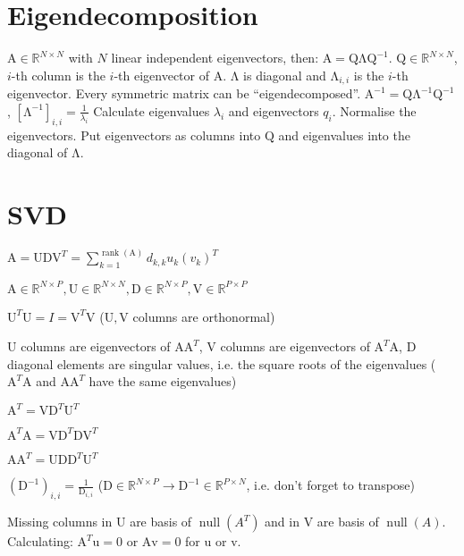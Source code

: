 \documentclass[a4paper, 11pt, landscape]{article}
\newcommand{\matr}[1]{\boldsymbol{\mathrm{#1}}}
\begin{document}
\begin{multicols*}{3}
\section{Eigendecomposition}
$\matr{A} \in \mathbb{R}^{N \times N}$ with $N$ linear independent eigenvectors, then: $\matr{A} = \matr{Q \Lambda Q}^{-1}$. $\matr{Q} \in \mathbb{R}^{N \times N}$, $i$-th column is the $i$-th eigenvector of $\matr{A}$. $\matr{\Lambda}$ is diagonal and $\matr{\Lambda}_{i,i}$ is the $i$-th eigenvector. Every symmetric matrix can be ``eigendecomposed''. 
$\matr{A}^{-1} = \matr{Q} \matr{\Lambda}^{-1} \matr{Q}^{-1}$, $\left[ \matr{\Lambda}^{-1} \right]_{i,i} = \frac{1}{\lambda_i}$ 
Calculate eigenvalues $\lambda_i$ and eigenvectors $q_i$. Normalise the eigenvectors. Put eigenvectors as columns into $\matr{Q}$ and eigenvalues into the diagonal of $\matr{\Lambda}$.

\section{SVD}
\begin{compactitem}
	\item $\matr{A} = \matr{U} \matr{D} \matr{V}^T = \sum_{k=1}^{\operatorname{rank}(\matr{A})} d_{k,k} u_k (v_k)^T$
	\item $\matr{A} \in \mathbb{R}^{N \times P}, \matr{U} \in \mathbb{R}^{N \times N}, \matr{D} \in \mathbb{R}^{N \times P}, \matr{V} \in \mathbb{R}^{P \times P}$
	\item $\matr{U}^T \matr{U} = I = \matr{V}^T \matr{V}$ ($\matr{U}, \matr{V}$ columns are orthonormal)
	\item $\matr{U}$ columns are eigenvectors of $\matr{A} \matr{A}^T$, $\matr{V}$ columns are eigenvectors of $\matr{A}^T \matr{A}$, $\matr{D}$ diagonal elements are singular values, i.e. the square roots of the eigenvalues ($\matr{A}^T \matr{A}$ and $\matr{A} \matr{A}^T$ have the same eigenvalues)
	\begin{listcols}
		\item $\matr{A}^T = \matr{V} \matr{D}^T \matr{U}^T$
		\item $\matr{A}^T \matr{A} = \matr{V} \matr{D}^T \matr{D} \matr{V}^T$
		\item $\matr{A} \matr{A}^T = \matr{U} \matr{D} \matr{D}^T \matr{U}^T$
	\end{listcols}
	\item $(\matr{D}^{-1})_{i,i} = \frac{1}{\matr{D}_{i, i}}$ ($\matr{D} \in \mathbb{R}^{N \times P} \to \matr{D}^{-1} \in \mathbb{R}^{P \times N}$, i.e. don't forget to transpose)
	\item Missing columns in $\matr{U}$ are basis of $\operatorname{null}(A^T)$ and in $\matr{V}$ are basis of $\operatorname{null}(A)$. Calculating: $\matr{A}^T \matr{u} = \matr{0}$ or $\matr{A} \matr{v} = \matr{0}$ for $\matr{u}$ or $\matr{v}$.
\end{compactitem}


\end{multicols*}
\end{document}
